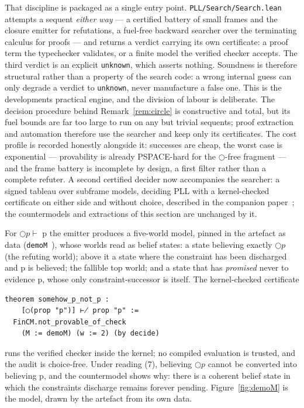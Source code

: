 That discipline is packaged as a single entry point.
\texttt{PLL/\allowbreak{}Search/\allowbreak{}Search.lean} attempts a sequent \emph{either way} --- a
certified battery of small frames and the closure emitter for
refutations, a fuel-free backward searcher over the terminating calculus
for proofs --- and returns a verdict carrying its own certificate: a
proof term the typechecker validates, or a finite model the verified
checker accepts. The third verdict is an explicit \texttt{unknown},
which asserts nothing. Soundness is therefore structural rather than a
property of the search code: a wrong internal guess can only degrade a
verdict to \texttt{unknown}, never manufacture a false one. This is the
development\textquotesingle s practical engine, and the division of
labour is deliberate. The decision procedure behind
Remark~\ref{rem:circle} is constructive and total, but its fuel bounds
are far too large to run on any but trivial sequents; proof extraction
and automation therefore use the searcher and keep only its
certificates. The cost profile is recorded honestly alongside it:
successes are cheap, the worst case is exponential --- provability is
already PSPACE-hard for the \ensuremath{\bigcirc}-free fragment --- and
the frame battery is incomplete by design, a first filter rather than a
complete refuter. A second certified decider now accompanies the
searcher: a signed tableau over subframe models, deciding PLL with a
kernel-checked certificate on either side and without choice,
described in the companion paper~\cite{SemPaper}; the countermodels
and extractions of this section are unchanged by it.

For \ensuremath{\bigcirc p \vdash} p the emitter produces a five-world model, pinned in the
artefact as data (\texttt{demoM}~), whose worlds read as belief states: a state
believing exactly \ensuremath{\bigcirc p} (the refuting world); above it a state where the
constraint has been discharged and p is believed; the fallible top world;
and a state that has \emph{promised} never to
evidence p, whose only constraint-successor is itself. The
kernel-checked certificate

\begin{lstlisting}
theorem somehow_p_not_p :
    [◯(prop "p")] ⊬ prop "p" :=
  FinCM.not_provable_of_check
    (M := demoM) (w := 2) (by decide)
\end{lstlisting}

runs the verified checker inside the kernel; no compiled evaluation is
trusted, and the audit is choice-free. Under reading (7), believing \ensuremath{\bigcirc p}
cannot be converted into believing p, and the countermodel shows why: there
is a coherent belief state in which the constraint\textquotesingle s discharge
remains forever pending. Figure~\ref{fig:demoM} is the model, drawn
by the artefact from its own data.

